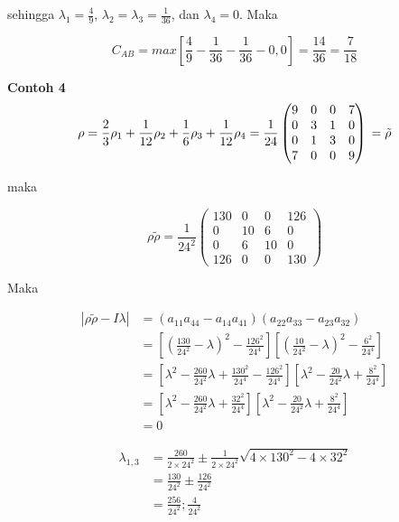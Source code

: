 sehingga $\lambda_1=\frac{4}{9}$, $\lambda_2=\lambda_3=\frac{1}{36}$, dan $
\lambda_4=0$. Maka

\begin{equation}
	C_{AB}=max[\frac{4}{9}-\frac{1}{36}-\frac{1}{36}-0,0]=\frac{14}{36}=\frac{7}{18}
\end{equation}

\textbf{Contoh 4}
\begin{equation}
	\rho = \frac{2}{3}\rho_1 + \frac{1}{12}\rho_2
	+\frac{1}{6}\rho_3+\frac{1}{12}\rho_4\\
	=\frac{1}{24}
	\begin{pmatrix}
		9&0&0&7\\
		0&3&1&0\\
		0&1&3&0\\
		7&0&0&9
	\end{pmatrix}\\
	=\tilde{\rho}
\end{equation}

maka 

\begin{equation}
	\rho \tilde{\rho} =\frac{1}{24^2}
	\begin{pmatrix}
		130&0&0&126\\
		0&10&6&0\\
		0&6&10&0\\
		126&0&0&130
	\end{pmatrix}
\end{equation}

Maka

\begin{equation}
	\begin{aligned}
		|\rho \tilde{\rho}-I\lambda|
		&=(a_{11}a_{44}-a_{14}a_{41})(a_{22}a_{33}-a_{23}a_{32})\\
		&=[(\frac{130}{24^2}-\lambda)^2-\frac{126^2}{24^4}][(\frac{10}{24^2}-\lambda)^2-\frac{6^2}{24^4}]\\
		&=[\lambda^2-\frac{260}{24^2}\lambda+\frac{130^2}{24^4}-\frac{126^2}{24^4}][\lambda^2-\frac{20}{24^2}\lambda+\frac{8^2}{24^4}]\\
		&=[\lambda^2-\frac{260}{24^2}\lambda+\frac{32^2}{24^4}][\lambda^2-\frac{20}{24^2}\lambda+\frac{8^2}{24^4}]\\
		&=0
	\end{aligned}
\end{equation}

\begin{equation}
	\begin{aligned}
		\lambda_{1,3}
		&=\frac{260}{2\times24^2}\pm\frac{1}{2\times24^2}\sqrt{4\times130^2-4\times32^2}\\
		&=\frac{130}{24^2}\pm\frac{126}{24^2}\\
		&=\frac{256}{24^2}; \frac{4}{24^2}
	\end{aligned}
\end{equation}

